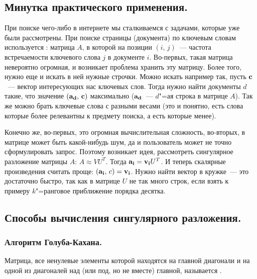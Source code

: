 \subsection{Минутка практического применения.}

\begin{exercise}
    При поиске чего-либо в интернете мы сталкиваемся с задачами, которые уже были рассмотрены.
    При поиске страницы (документа) по ключевым словам используется :
    матрица $A$, в которой на позиции $(i,\, j)$~--- частота встречаемости ключевого слова $j$ в документе $i$.
    Во-первых, такая матрица невероятно огромная, и возникает проблема хранить эту матрицу. Более того, нужно еще
    и искать в ней нужные строчки. Можно искать например так, пусть $\mathbf{c}$~--- вектор интересующих нас ключевых слов.
    Тогда нужно найти документы $d$ такие, что значение $(\mathbf{a_{d}},\, \mathbf{c})$ максимально ($\mathbf{a_{d}}$~--- $d$"=ая строка в матрице $A$).
    Так же можно брать ключевые слова с разными весами (это и понятно, есть слова которые более релевантны к предмету поиска, а есть которые менее).

    Конечно же, во-первых, это огромная вычислительная сложность, во-вторых, в матрице может быть какой-нибудь шум, да и пользователь может не точно сформулировать запрос.
    Поэтому возникает идея, рассмотреть сингулярное разложение матрицы $A$: $A\approx VU^T$. Тогда $\mathbf{a_i}=\mathbf{v_i}U^T$. И теперь скалярные произведения
    считать проще: $(\mathbf{a_i},\, c)=\mathbf{v_i}$. Нужно найти вектор в кружке~--- это достаточно быстро, так как в матрице $U$ не так много строк,
    если взять к примеру $k$"=ранговое приближение порядка десятка.
\end{exercise}

\subsection{Способы вычисления сингулярного разложения.}

\subsubsection{Алгоритм Голуба-Кахана.}

\begin{definition}
    Матрица, все ненулевые элементы которой находятся на главной диагонали и на одной из диагоналей над (или под, но не вместе) главной, называется
    .
\end{definition}

